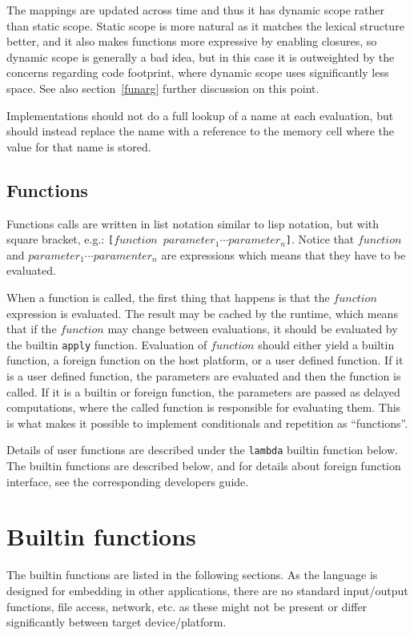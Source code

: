 The mappings are updated across time and thus it has dynamic scope rather than static scope. Static scope is more natural as it matches the lexical structure better, and it also makes functions more expressive by enabling closures, so dynamic scope is generally a bad idea, but in this case it is outweighted by the concerns regarding code footprint, where dynamic scope uses significantly less space. 
See also section~\ref{funarg} further discussion on this point.

Implementations should not do a full lookup of a name at each evaluation, but should instead replace the name with a reference to the memory cell where the value for that name is stored.

\subsection{Functions}

Functions calls are written in list notation similar to lisp notation, but with square bracket, e.g.:
{\tt{[}$function$ $parameter_1\cdots parameter_n$\tt{]}}. 
Notice that $function$ and $parameter_1\cdots paramenter_n$ are expressions which means that they have to be evaluated.

When a function is called, the first thing that happens is that the $function$ expression is evaluated. The result may be cached by the runtime, which means that if the $function$ may change between evaluations, it should be evaluated by the builtin \verb|apply| function.
Evaluation of $function$ should either yield a builtin function, a foreign function on the host platform, or a user defined function. If it is a user defined function, the parameters are evaluated and then the function is called. If it is a builtin or foreign function, the parameters are passed as delayed computations, where the called function is responsible for evaluating them. 
This is what makes it possible to implement conditionals and repetition as ``functions''. 

Details of user functions are described under the \verb|lambda| builtin function below. The builtin functions are described below, and for details about foreign function interface, see the corresponding developers guide.


\section{Builtin functions}
The builtin functions are listed in the following sections. As the language is designed for embedding in other applications, there are no standard input/output functions, file access, network, etc. as these might not be present or differ significantly between target device/platform. 
